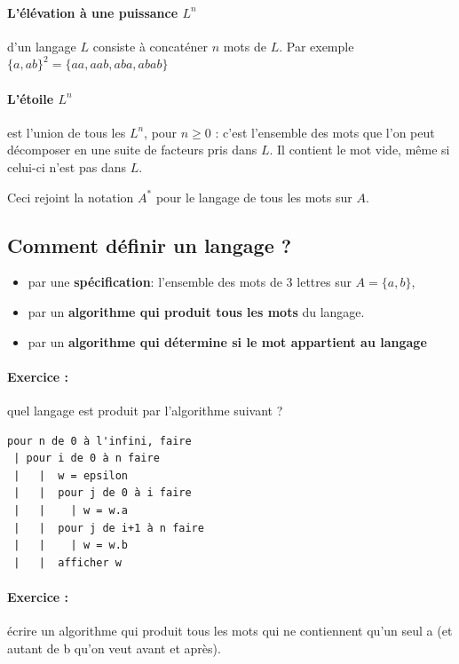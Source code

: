 \documentclass[10pt,twoside]{article}
\begin{document}
\paragraph{L'élévation à une puissance  $L^n$} d'un langage $L$ 
consiste à concaténer $n$ mots de $L$.  Par exemple $\{a,ab\}^2 = \{
aa, aab, aba, abab \}$

\paragraph{L'étoile $L^n$} est l'union de tous les $L^n$, 
pour $n \geq 0$ : c'est l'ensemble des mots que l'on peut décomposer
en une suite de facteurs pris dans $L$. Il contient le mot vide, même
si celui-ci n'est pas dans $L$.

Ceci rejoint la notation  $A^*$ pour le langage de tous les
mots sur $A$.

\subsection{Comment définir  un langage ?}

\begin{itemize}
\item  par une \textbf{spécification}: l'ensemble des mots de 3 lettres sur 
$A = \{a, b \}$,
\item par un \textbf{algorithme qui produit tous les mots} du langage. 
\item par un \textbf{algorithme qui détermine si le mot appartient au langage}
\end{itemize}

\paragraph{Exercice : } quel langage est produit par l'algorithme suivant ?
\begin{verbatim}
pour n de 0 à l'infini, faire
 | pour i de 0 à n faire 
 |   |  w = epsilon
 |   |  pour j de 0 à i faire 
 |   |    | w = w.a
 |   |  pour j de i+1 à n faire
 |   |    | w = w.b
 |   |  afficher w
\end{verbatim}


\paragraph{Exercice : } écrire un algorithme qui produit tous les mots 
qui ne contiennent qu'un seul a (et autant de b qu'on veut avant et après).
\end{document}
